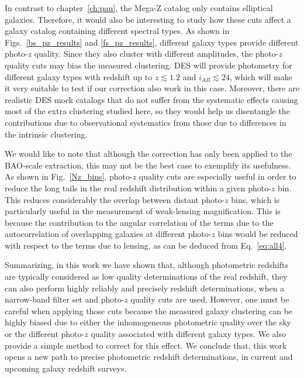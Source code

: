 In contrast to chapter~\ref{ch:pau}, the Mega-Z catalog only contains elliptical galaxies. Therefore, it would also be interesting to study how these cuts affect a galaxy catalog containing different spectral types. As shown in Figs.~\ref{bs_pz_results} and \ref{fs_pz_results}, different galaxy types provide different photo-$z$ quality. Since they also cluster with different amplitudes, the photo-$z$ quality cuts may bias the measured clustering. DES will provide photometry for different galaxy types with redshift up to $z\lesssim1.2$ and $i_{AB}\lesssim24$, which will make it very suitable to test if our correction also work in this case. Moreover, there are realistic DES mock catalogs that do not suffer from the systematic effects causing most of the extra clustering studied here, so they would help us disentangle the contributions due to observational systematics from those due to differences in the intrinsic clustering. 

We would like to note that although the correction has only been applied to the BAO-scale extraction, this may not be the best case to exemplify its usefulness. As shown in Fig.~\ref{Nz_bins}, photo-$z$ quality cuts are especially useful in order to reduce the long tails in the real redshift distribution within a given photo-$z$ bin. This reduces considerably the overlap between distant photo-$z$ bins, which is particularly useful in the measurement of weak-lensing magnification. This is because the contribution to the angular correlation of the terms due to the autocorrelation of overlapping galaxies at different photo-$z$ bins would be reduced with respect to the terms due to lensing, as can be deduced from Eq.~\ref{eq:all4}.

Summarizing, in this work we have shown that, although photometric redshifts are typically considered as low quality determinations of the real redshift, they can also perform highly reliably and precisely redshift determinations, when a narrow-band filter set and photo-$z$ quality cuts are used. However, one must be careful when applying those cuts because the measured galaxy clustering can be highly biased due to either the inhomogeneous photometric quality over the sky or the different photo-$z$ quality associated with different galaxy types. We also provide a simple method to correct for this effect. We conclude that, this work opens a new path to precise photometric redshift determinations, in current and upcoming galaxy redshift surveys.
